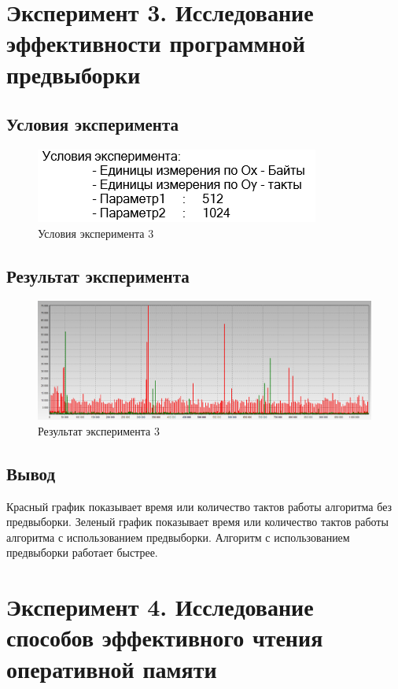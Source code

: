 \documentclass{article}
\begin{document}
\clearpage\section{Эксперимент 3. Исследование эффективности программной предвыборки}
\subsection{Условия эксперимента}
\begin{figure}[h]
	\centering
	\includegraphics[scale=0.7]{tools/in_3.png}
	\caption{Условия эксперимента 3}
\end{figure}

\subsection{Результат эксперимента}
\begin{figure}[h]
	\centering
	\includegraphics[scale=0.5]{tools/exp_3.png}
	\caption{Результат эксперимента 3}
\end{figure}

\subsection{Вывод}
Красный график показывает время или количество тактов работы алгоритма без предвыборки. Зеленый график показывает 
время или количество тактов работы алгоритма с использованием предвыборки. Алгоритм с использованием предвыборки 
работает быстрее.

\clearpage\section{Эксперимент 4. Исследование способов эффективного чтения оперативной памяти}
\end{document}
